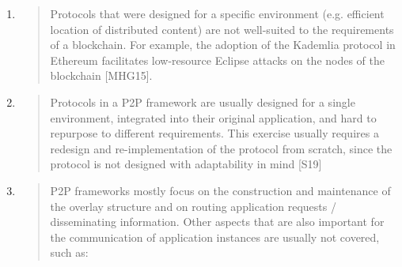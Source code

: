 \documentclass[11pt,a4paper]{article}
\begin{document}
\begin{enumerate}
\def\labelenumi{\arabic{enumi}.}
\item
  \begin{quote}
  Protocols that were designed for a specific environment (e.g.
  efficient location of distributed content) are not well-suited to the
  requirements of a blockchain. For example, the adoption of the
  Kademlia protocol in Ethereum facilitates low-resource Eclipse attacks
  on the nodes of the blockchain {[}MHG15{]}.
  \end{quote}
\item
  \begin{quote}
  Protocols in a P2P framework are usually designed for a single
  environment, integrated into their original application, and hard to
  repurpose to different requirements. This exercise usually requires a
  redesign and re-implementation of the protocol from scratch, since the
  protocol is not designed with adaptability in mind {[}S19{]}
  \end{quote}
\item
  \begin{quote}
  P2P frameworks mostly focus on the construction and maintenance of the
  overlay structure and on routing application requests / disseminating
  information. Other aspects that are also important for the
  communication of application instances are usually not covered, such
  as:
  \end{quote}


\end{enumerate}
\end{document}
